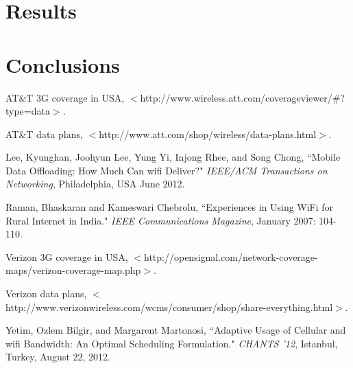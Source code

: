 \documentclass[12pt, fleqn]{article}
\begin{document}
\section{Results}


\section{Conclusions}


\newpage
\begin{thebibliography}{9}
    AT&T 3G coverage in USA,
    $<$http://www.wireless.att.com/coverageviewer/#?type=data$>$.
  
    AT&T data plans, 
    $<$http://www.att.com/shop/wireless/data-plans.html$>$.
    
    Lee, Kyunghan, Joohyun Lee, Yung Yi, Injong Rhee, and Song Chong, 
    ``Mobile Data Offloading: How Much Can wifi Deliver?"
    \emph{IEEE/ACM Transactions on Networking}, 
    Philadelphia, USA
    June 2012.
    
    Raman, Bhaskaran and Kameswari Chebrolu,
    ``Experiences in Using WiFi for Rural Internet in India."
    \emph{IEEE Communications Magazine},
    January 2007: 
    104-110.  
     
    Verizon 3G coverage in USA,
    $<$http://opensignal.com/network-coverage-maps/verizon-coverage-map.php$>$.
    
    Verizon data plans,
    $<$http://www.verizonwireless.com/wcms/consumer/shop/share-everything.html$>$.
  
    Yetim, Ozlem Bilgir, and Margarent Martonosi,
    ``Adaptive Usage of Cellular and wifi Bandwidth: An Optimal Scheduling Formulation."  
    \emph{CHANTS '12}, 
    Istanbul, Turkey, 
    August 22, 2012.
  
\end{thebibliography}
\end{document}
